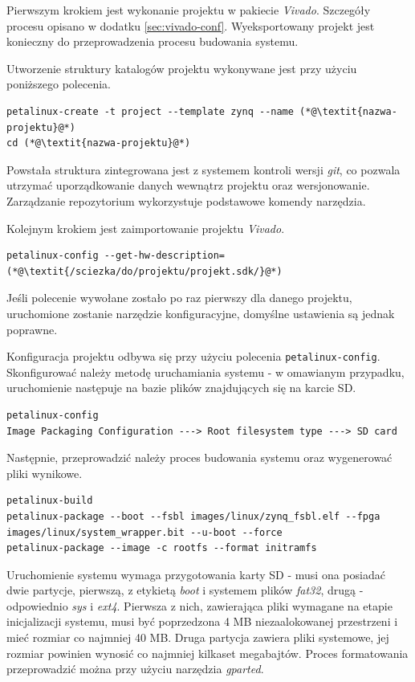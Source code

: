 Pierwszym krokiem jest wykonanie projektu w pakiecie \emph{Vivado}. Szczegóły procesu opisano w dodatku \ref{sec:vivado-conf}. Wyeksportowany projekt jest konieczny do przeprowadzenia procesu budowania systemu.

Utworzenie struktury katalogów projektu wykonywane jest przy użyciu poniższego polecenia.

\begin{lstlisting}[breaklines=true]
petalinux-create -t project --template zynq --name (*@\textit{nazwa-projektu}@*)
cd (*@\textit{nazwa-projektu}@*)
\end{lstlisting}

Powstała struktura zintegrowana jest z systemem kontroli wersji \emph{git}, co pozwala utrzymać uporządkowanie danych wewnątrz projektu oraz wersjonowanie. Zarządzanie repozytorium wykorzystuje podstawowe komendy narzędzia.

Kolejnym krokiem jest zaimportowanie projektu \emph{Vivado}.

\begin{lstlisting}[breaklines=true]
petalinux-config --get-hw-description=(*@\textit{/sciezka/do/projektu/projekt.sdk/}@*)
\end{lstlisting}

Jeśli polecenie wywołane zostało po raz pierwszy dla danego projektu, uruchomione zostanie narzędzie konfiguracyjne, domyślne ustawienia są jednak poprawne.

Konfiguracja projektu odbywa się przy użyciu polecenia \texttt{petalinux-config}.
Skonfigurować należy metodę uruchamiania systemu - w omawianym przypadku, uruchomienie następuje na bazie plików znajdujących się na karcie SD.
\begin{lstlisting}[breaklines=true]
petalinux-config
Image Packaging Configuration ---> Root filesystem type ---> SD card
\end{lstlisting}

Następnie, przeprowadzić należy proces budowania systemu oraz wygenerować pliki wynikowe.

\begin{lstlisting}[breaklines=true]
petalinux-build
petalinux-package --boot --fsbl images/linux/zynq_fsbl.elf --fpga images/linux/system_wrapper.bit --u-boot --force
petalinux-package --image -c rootfs --format initramfs
\end{lstlisting}

Uruchomienie systemu wymaga przygotowania karty SD - musi ona posiadać dwie partycje, pierwszą, z etykietą \emph{boot} i systemem plików \emph{fat32}, drugą - odpowiednio \emph{sys} i \emph{ext4}. Pierwsza z nich, zawierająca pliki wymagane na etapie inicjalizacji systemu, musi być poprzedzona 4 MB niezaalokowanej przestrzeni i mieć rozmiar co najmniej 40 MB. Druga partycja zawiera pliki systemowe, jej rozmiar powinien wynosić co najmniej kilkaset megabajtów. Proces formatowania przeprowadzić można przy użyciu narzędzia \emph{gparted}.

